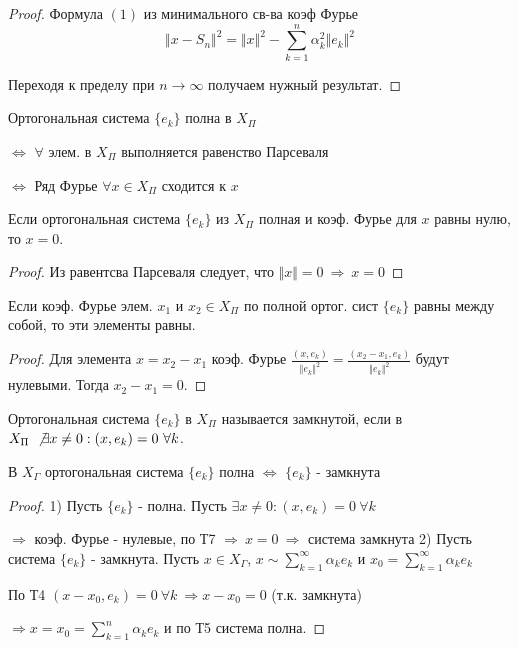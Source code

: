 \documentclass{article}
\theoremstyle{definition}
\numberwithin{theorem}{section}
\numberwithin{lemma}{section}
\numberwithin{definition}{section}
\numberwithin{corollary}{section}
\numberwithin{equation}{section}
\let\implies\Rightarrow
\let\iff\Leftrightarrow
\begin{document}
\begin{proof}
  Формула $(1)$ из минимального св-ва коэф Фурье
  \[
    \Vert x-S_n \Vert^{2}=\Vert x \Vert^{2}-\sum_{k=1}^{n}\alpha_k^{2}\Vert e_k \Vert^{2}
  \]

  Переходя к пределу при $n\to\infty$ получаем нужный результат.
\end{proof}
\begin{corollary}
  Ортогональная система $\{e_k\}$ полна в $X_\Pi$ 

  $\iff$ $\forall $ элем. в $X_\Pi$ выполняется равенство Парсеваля 

  $\iff$ Ряд Фурье $\forall x \in X_\Pi$ сходится к $x$
\end{corollary}
\begin{theorem}[Т7]
  Если ортогональная система $\{e_k\}$ из $X_\Pi$ полная и коэф. Фурье для $x$ равны нулю,
  то $x = 0$.
\end{theorem}
\begin{proof}
  Из равентсва Парсеваля следует, что $\Vert x \Vert=0 \ \implies \ x=0$
\end{proof}
\begin{corollary}
  Если коэф. Фурье элем. $x_1$ и $x_2 \in X_\Pi$ по полной ортог. сист $\{e_k\}$
  равны между собой, то эти элементы равны.
\end{corollary}
\begin{proof}
Для элемента $x=x_2-x_1$ коэф. Фурье $\frac{(x,e_k)}{\Vert e_k \Vert^{2}}=\frac{(x_2-x_1,e_k)}{\Vert e_k \Vert^{2}}$
будут нулевыми. Тогда $x_2-x_1=0$.
\end{proof}
\begin{definition}
  Ортогональная система $\{e_k\}$ в $X_\Pi$ называется замкнутой, если в $X_\Pi \ \not \exists x\neq 0: (x,e_k)=0 \ \forall k$.
\end{definition}
\begin{theorem}
  В $X_\Gamma$ ортогональная система $\{e_k\}$ полна 
  $\iff$ $\{e_k\}$ - замкнута
\end{theorem}
\begin{proof}
  1) Пусть $\{e_k\}$ - полна. Пусть $\exists x \neq 0: (x,e_k)=0\ \forall k$

  $\implies$ коэф. Фурье - нулевые, по Т7 $\implies \ x= 0 \ \implies$ система замкнута
  2) Пусть система $\{e_k\}$ - замкнута. Пусть $x\in X_\Gamma$, $x \sim \sum_{k=1}^{\infty}\alpha_ke_k$ 
  и $x_0 = \sum_{ k=1}^{\infty}\alpha_ke_k$

  По Т4 $(x-x_0,e_k)=0 \ \forall k \ \implies x-x_0=0$ (т.к. замкнута)

  $\implies x = x_0 = \sum_{k=1}^{n}\alpha_ke_k$ и по Т5 система полна.
\end{proof}
\end{document}

